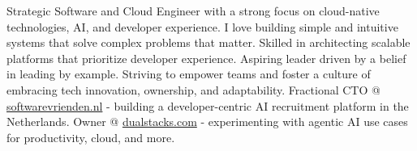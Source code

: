 
\begin{cvparagraph}
Strategic Software and Cloud Engineer with a strong focus on cloud-native technologies, AI, and developer experience. I love building simple and intuitive systems that solve complex problems that matter. Skilled in architecting scalable platforms that prioritize developer experience. Aspiring leader driven by a belief in leading by example. Striving to empower teams and foster a culture of embracing tech innovation, ownership, and adaptability. Fractional CTO @ \href{https://softwarevrienden.nl}{softwarevrienden.nl} - building a developer-centric AI recruitment platform in the Netherlands. Owner @ \href{https://dualstacks.com}{dualstacks.com} - experimenting with agentic AI use cases for productivity, cloud, and more.
\end{cvparagraph}
